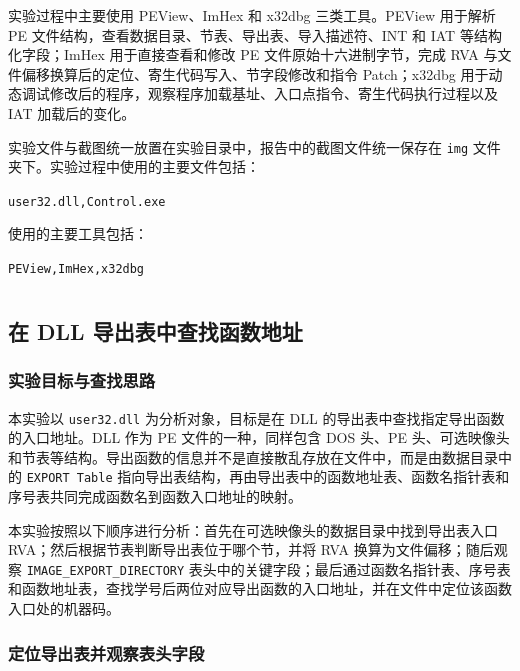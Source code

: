 ﻿\documentclass[12pt]{ctexart}
\begin{document}
实验过程中主要使用 PEView、ImHex 和 x32dbg 三类工具。PEView 用于解析 PE 文件结构，查看数据目录、节表、导出表、导入描述符、INT 和 IAT 等结构化字段；ImHex 用于直接查看和修改 PE 文件原始十六进制字节，完成 RVA 与文件偏移换算后的定位、寄生代码写入、节字段修改和指令 Patch；x32dbg 用于动态调试修改后的程序，观察程序加载基址、入口点指令、寄生代码执行过程以及 IAT 加载后的变化。

实验文件与截图统一放置在实验目录中，报告中的截图文件统一保存在 \texttt{img} 文件夹下。实验过程中使用的主要文件包括：

\begin{center}
\texttt{user32.dll,\quad Control.exe}
\end{center}

使用的主要工具包括：

\begin{center}
\texttt{PEView,\quad ImHex,\quad x32dbg}
\end{center}

\section{}
\subsection{在 DLL 导出表中查找函数地址}

\subsubsection{实验目标与查找思路}

本实验以 \texttt{user32.dll} 为分析对象，目标是在 DLL 的导出表中查找指定导出函数的入口地址。DLL 作为 PE 文件的一种，同样包含 DOS 头、PE 头、可选映像头和节表等结构。导出函数的信息并不是直接散乱存放在文件中，而是由数据目录中的 \texttt{EXPORT Table} 指向导出表结构，再由导出表中的函数地址表、函数名指针表和序号表共同完成函数名到函数入口地址的映射。

本实验按照以下顺序进行分析：首先在可选映像头的数据目录中找到导出表入口 RVA；然后根据节表判断导出表位于哪个节，并将 RVA 换算为文件偏移；随后观察 \texttt{IMAGE\_EXPORT\_DIRECTORY} 表头中的关键字段；最后通过函数名指针表、序号表和函数地址表，查找学号后两位对应导出函数的入口地址，并在文件中定位该函数入口处的机器码。

\subsubsection{定位导出表并观察表头字段}
\end{document}
